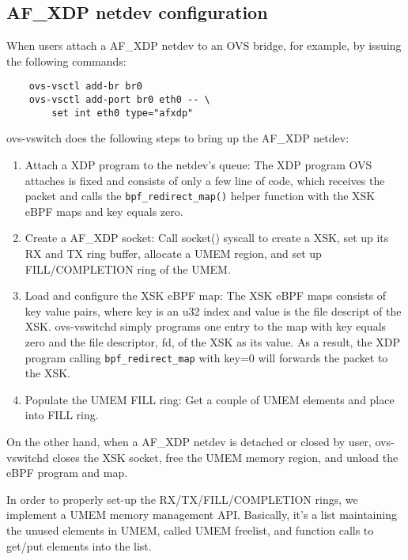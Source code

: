 \documentclass[10pt]{sigplanconf}
\begin{document}
\subsection{AF\_XDP netdev configuration}
When users attach a AF\_XDP netdev to an OVS bridge, for example, by
issuing the following commands:
{\small
\begin{verbatim}
    ovs-vsctl add-br br0
    ovs-vsctl add-port br0 eth0 -- \
        set int eth0 type="afxdp"
\end{verbatim}
}
ovs-vswitch does the following steps to bring up the
AF\_XDP netdev:
\begin{enumerate}
\item Attach a XDP program to the netdev's queue:
The XDP program OVS attaches is fixed and consists
of only a few line of code, which receives the packet and
calls the \texttt{bpf\_redirect\_map()} helper function with
the XSK eBPF maps and key equals zero.

\item Create a AF\_XDP socket:
Call socket() syscall to create a XSK,
set up its RX and TX ring buffer, allocate a UMEM region,
and set up FILL/COMPLETION ring of the UMEM.

\item Load and configure the XSK eBPF map:
The XSK eBPF maps consists of key value pairs, where key is an u32 index and value is
the file descript of the XSK.  ovs-vswitchd simply programs one entry to the map with
key equals zero and the file descriptor, fd, of the XSK as its value.
As a result, the XDP program calling \texttt{bpf\_redirect\_map} with key=0 will
forwards the packet to the XSK.

\item Populate the UMEM FILL ring: Get a couple of UMEM elements and place into FILL ring.
\end{enumerate}
On the other hand, when a AF\_XDP netdev is detached or closed by user,
ovs-vswitchd closes the XSK socket, free the UMEM memory region, and
unload the eBPF program and map.

In order to properly set-up the RX/TX/FILL/COMPLETION rings, we implement a
UMEM memory management API. Basically, it's a list maintaining the unused elements
in UMEM, called UMEM freelist, and function calls to get/put elements into the list.
\end{document}
